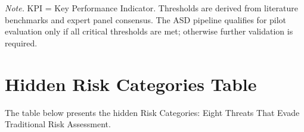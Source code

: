\vspace{2pt}
\noindent\textit{Note.} KPI = Key Performance Indicator. Thresholds are derived from literature benchmarks and expert panel consensus. The ASD pipeline qualifies for pilot evaluation only if all critical thresholds are met; otherwise further validation is required.


\section*{Hidden Risk Categories Table}
\label{sec:app_ch5_tab_hidden_risks_app}
\noindent The table below presents the hidden Risk Categories: Eight Threats That Evade Traditional Risk Assessment.

